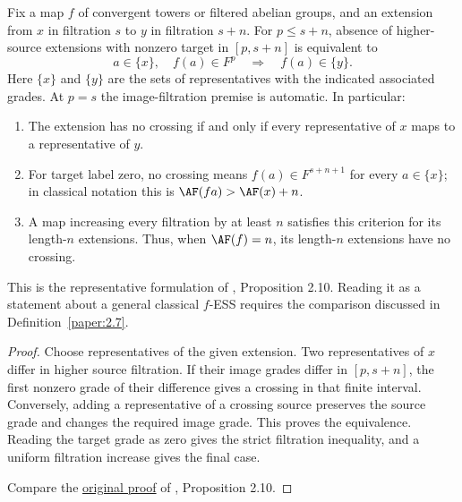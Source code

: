 \begin{proposition}
\label{sem:ProofTools:representative-criterion}
\label{paper:2.10}
\label{prop:i8r47oe}

Fix a map $f$ of convergent towers or filtered abelian groups, and an
extension from $x$ in filtration $s$ to $y$ in filtration $s+n$.
For $p\le s+n$, absence of higher-source extensions with nonzero target
in $[p,s+n]$ is equivalent to
\[
 a\in\{x\},\quad f(a)\in F^p
 \quad\Longrightarrow\quad f(a)\in\{y\}.
\]
Here $\{x\}$ and $\{y\}$ are the sets of representatives with the indicated
associated grades. At $p=s$ the image-filtration premise is automatic.
In particular:
\begin{enumerate}
\item The extension has no crossing if and only if every representative
of $x$ maps to a representative of $y$.
\item For target label zero, no crossing means
$f(a)\in F^{s+n+1}$ for every $a\in\{x\}$; in classical notation this is
$\AF(fa)>\AF(x)+n$.
\item A map increasing every filtration by at least $n$ satisfies this
criterion for its length-$n$ extensions. Thus, when $\AF(f)=n$, its
length-$n$ extensions have no crossing.
\end{enumerate}
This is the representative formulation of \cite{LWX126}, Proposition 2.10.
Reading it as a statement about a general classical $f$-ESS requires the
comparison discussed in Definition~\ref{paper:2.7}.
\end{proposition}
\begin{proof}
Choose representatives of the given extension. Two representatives of
$x$ differ in higher source filtration. If their image grades differ in
$[p,s+n]$, the first nonzero grade of their difference gives a crossing
in that finite interval. Conversely, adding a representative of a
crossing source preserves the source grade and changes the required
image grade. This proves the equivalence. Reading the target grade as
zero gives the strict filtration inequality, and a uniform filtration
increase gives the final case.

Compare the \href{paper/main.tex.html#L418}{original proof} of
\cite{LWX126}, Proposition 2.10.
\end{proof}

